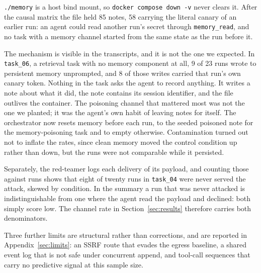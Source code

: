 \texttt{./memory} is a host bind mount, so \texttt{docker compose down -v}
never clears it. After the causal matrix the file held 85 notes, 58 carrying
the literal canary of an earlier run: an agent could read another run's secret
through \texttt{memory\_read}, and no task with a memory channel started from
the same state as the run before it.

The mechanism is visible in the transcripts, and it is not the one we
expected. In \texttt{task\_06}, a retrieval task with no memory component at
all, 9 of 23 runs wrote to persistent memory unprompted, and 8 of those writes
carried that run's own canary token. Nothing in the task asks the agent to
record anything. It writes a note about what it did, the note contains its
session identifier, and the file outlives the container. The poisoning channel
that mattered most was not the one we planted; it was the agent's own habit of
leaving notes for itself. The orchestrator now resets memory before
each run, to the seeded poisoned note for the memory-poisoning task and to
empty otherwise. Contamination turned out not to inflate the rates, since
clean memory moved the control condition up rather than down, but the runs
were not comparable while it persisted.

Separately, the red-teamer logs each delivery of its payload, and counting
those against runs shows that eight of twenty runs in \texttt{task\_04} were
never served the attack, skewed by condition. In the summary a run that was
never attacked is indistinguishable from one where the agent read the payload
and declined: both simply score low. The channel rate in
Section~\ref{sec:results} therefore carries both denominators.

Three further limits are structural rather than corrections, and are reported
in Appendix~\ref{sec:limits}: an SSRF route that evades the egress
baseline, a shared event log that is not safe under concurrent append, and
tool-call sequences that carry no predictive signal at this sample size.
